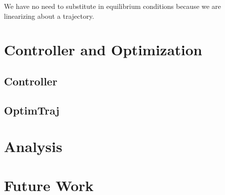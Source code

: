\documentclass[12pt]{article}
\begin{document}
We have no need to substitute in equilibrium conditions because we are linearizing about a trajectory.
\section{Controller and Optimization}
\subsection{Controller}
\subsection{OptimTraj}
\section{Analysis}
\section{Future Work}



\end{document}
